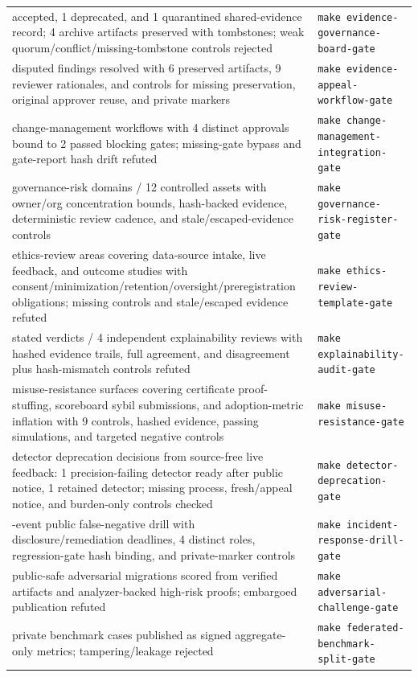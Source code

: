 \documentclass[11pt]{article}
\newcommand{\gate}[1]{\texttt{make #1}}
\begin{document}
\begin{table}[h]
\begin{tabular}{>{\raggedright\arraybackslash}p{6.6cm}>{\raggedright\arraybackslash}p{6.4cm}}
1 accepted, 1 deprecated, and 1 quarantined shared-evidence record; 4 archive artifacts preserved with tombstones; weak quorum/conflict/missing-tombstone controls rejected & \gate{evidence-governance-board-gate} \\
3 disputed findings resolved with 6 preserved artifacts, 9 reviewer rationales, and controls for missing preservation, original approver reuse, and private markers & \gate{evidence-appeal-workflow-gate} \\
2 change-management workflows with 4 distinct approvals bound to 2 passed blocking gates; missing-gate bypass and gate-report hash drift refuted & \gate{change-management-integration-gate} \\
4 governance-risk domains / 12 controlled assets with owner/org concentration bounds, hash-backed evidence, deterministic review cadence, and stale/escaped-evidence controls & \gate{governance-risk-register-gate} \\
3 ethics-review areas covering data-source intake, live feedback, and outcome studies with consent/minimization/retention/oversight/preregistration obligations; missing controls and stale/escaped evidence refuted & \gate{ethics-review-template-gate} \\
2 stated verdicts / 4 independent explainability reviews with hashed evidence trails, full agreement, and disagreement plus hash-mismatch controls refuted & \gate{explainability-audit-gate} \\
3 misuse-resistance surfaces covering certificate proof-stuffing, scoreboard sybil submissions, and adoption-metric inflation with 9 controls, hashed evidence, passing simulations, and targeted negative controls & \gate{misuse-resistance-gate} \\
2 detector deprecation decisions from source-free live feedback: 1 precision-failing detector ready after public notice, 1 retained detector; missing process, fresh/appeal notice, and burden-only controls checked & \gate{detector-deprecation-gate} \\
7-event public false-negative drill with disclosure/remediation deadlines, 4 distinct roles, regression-gate hash binding, and private-marker controls & \gate{incident-response-drill-gate} \\
2 public-safe adversarial migrations scored from verified artifacts and analyzer-backed high-risk proofs; embargoed publication refuted & \gate{adversarial-challenge-gate} \\
3 private benchmark cases published as signed aggregate-only metrics; tampering/leakage rejected & \gate{federated-benchmark-split-gate} \\

\end{tabular}
\end{table}
\end{document}
